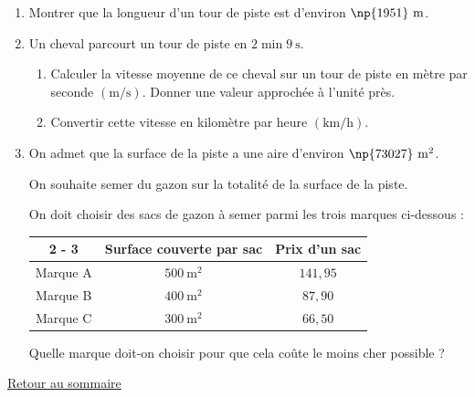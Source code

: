 \documentclass[11pt]{article}
\newcommand{\euro}{\eurologo{}}
\begin{document}
\begin{enumerate}
\item Montrer que la longueur d'un tour de piste est d'environ $\np{1951} \mathrm{~m}$.
\item Un cheval parcourt un tour de piste en $2 \min 9 \mathrm{~s}$.
	\begin{enumerate}
		\item Calculer la vitesse moyenne de ce cheval sur un tour de piste en mètre par seconde $(\mathrm{m} / \mathrm{s})$. Donner une valeur approchée à l'unité près.

		\item Convertir cette vitesse en kilomètre par heure $(\mathrm{km} / \mathrm{h})$.
	\end{enumerate}

\item On admet que la surface de la piste a une aire d'environ $\np{73027} \mathrm{~m}^{2}$.

On souhaite semer du gazon sur la totalité de la surface de la piste.

On doit choisir des sacs de gazon à semer parmi les trois marques ci-dessous :

\begin{center}
\begin{tabular}{|c|c|c|}
\cline { 2 - 3 }
\multicolumn{1}{c|}{} & Surface couverte par sac & Prix d'un sac \\ \hline
Marque A & $500 \mathrm{~m}^{2}$ & $141,95$ \euro{} \\ \hline
Marque B & $400 \mathrm{~m}^{2}$ & $87,90$ \euro{} \\
\hline
Marque C & $300 \mathrm{~m}^{2}$ & $66,50$ \euro{} \\ \hline
\end{tabular}
\end{center}

Quelle marque doit-on choisir pour que cela coûte le moins cher possible ?
\end{enumerate}

\hyperlink{sommaire}{Retour au sommaire}
\newpage

\pagestyle{fancy}
\thispagestyle{empty}


\label{Etranger}
\hypertarget{Etranger}{}
\end{document}

